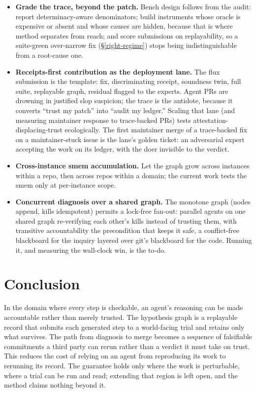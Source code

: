 \documentclass[
  10pt,
]{article}
\begin{document}
\begin{itemize}
  interchange format for auditable reasoning, so that ``show your work''
  becomes a machine-checkable demand rather than a rhetorical one.
\item
  \textbf{Grade the trace, beyond the patch.} Bench design follows from
  the audit: report determinacy-aware denominators; build instruments
  whose oracle is expensive or absent and whose causes are hidden,
  because that is where method separates from reach; and score
  submissions on replayability, so a suite-green over-narrow fix
  (\S\ref{right-regime}) stops being indistinguishable from a root-cause
  one.
\item
  \textbf{Receipts-first contribution as the deployment lane.} The flux
  submission is the template: fix, discriminating receipt, soundness
  twin, full suite, replayable graph, residual flagged to the experts.
  Agent PRs are drowning in justified slop suspicion; the trace is the
  antidote, because it converts ``trust my patch'' into ``audit my
  ledger.'' Scaling that lane (and measuring maintainer response to
  trace-backed PRs) tests attestation-displacing-trust ecologically. The
  first maintainer merge of a trace-backed fix on a maintainer-stuck
  issue is the lane's golden ticket: an adversarial expert accepting the
  work on its ledger, with the doer invisible to the verdict.
\item
  \textbf{Cross-instance smem accumulation.} Let the graph grow across
  instances within a repo, then across repos within a domain; the
  current work tests the smem only at per-instance scope.
\item
  \textbf{Concurrent diagnosis over a shared graph.} The monotone graph
  (nodes append, kills idempotent) permits a lock-free fan-out: parallel
  agents on one shared graph re-verifying each other's kills instead of
  trusting them, with transitive accountability the precondition that
  keeps it safe, a conflict-free blackboard for the inquiry layered over
  git's blackboard for the code. Running it, and measuring the
  wall-clock win, is the to-do.
\end{itemize}

\section{Conclusion}\label{conclusion}

In the domain where every step is checkable, an agent's reasoning can be
made accountable rather than merely trusted. The hypothesis graph is a
replayable record that submits each generated step to a world-facing
trial and retains only what survives. The path from diagnosis to merge
becomes a sequence of falsifiable commitments a third party can rerun
rather than a verdict it must take on trust. This reduces the cost of
relying on an agent from reproducing its work to rerunning its record.
The guarantee holds only where the work is perturbable, where a trial
can be run and read; extending that region is left open, and the method
claims nothing beyond it.
\end{document}
